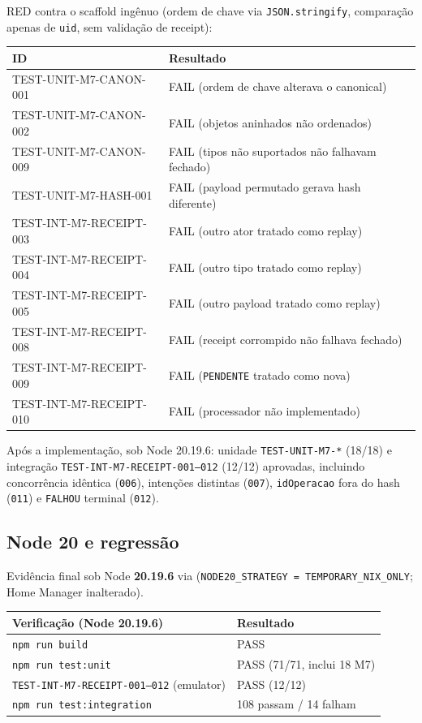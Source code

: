 RED contra o scaffold ingênuo (ordem de chave via \texttt{JSON.stringify},
comparação apenas de \texttt{uid}, sem validação de receipt):

\small
\begin{longtable}{@{}p{}p{}@{}}
\toprule
ID & Resultado \\
\midrule
\endhead
TEST-UNIT-M7-CANON-001 & FAIL (ordem de chave alterava o canonical) \\
TEST-UNIT-M7-CANON-002 & FAIL (objetos aninhados não ordenados) \\
TEST-UNIT-M7-CANON-009 & FAIL (tipos não suportados não falhavam fechado) \\
TEST-UNIT-M7-HASH-001 & FAIL (payload permutado gerava hash diferente) \\
TEST-INT-M7-RECEIPT-003 & FAIL (outro ator tratado como replay) \\
TEST-INT-M7-RECEIPT-004 & FAIL (outro tipo tratado como replay) \\
TEST-INT-M7-RECEIPT-005 & FAIL (outro payload tratado como replay) \\
TEST-INT-M7-RECEIPT-008 & FAIL (receipt corrompido não falhava fechado) \\
TEST-INT-M7-RECEIPT-009 & FAIL (\texttt{PENDENTE} tratado como nova) \\
TEST-INT-M7-RECEIPT-010 & FAIL (processador não implementado) \\
\bottomrule
\end{longtable}
\normalsize

Após a implementação, sob Node 20.19.6: unidade \texttt{TEST-UNIT-M7-*}
(18/18) e integração \texttt{TEST-INT-M7-RECEIPT-001--012} (12/12) aprovadas,
incluindo concorrência idêntica (\texttt{006}), intenções distintas
(\texttt{007}), \texttt{idOperacao} fora do hash (\texttt{011}) e
\texttt{FALHOU} terminal (\texttt{012}).

\subsection{Node 20 e regressão}

Evidência final sob Node \textbf{20.19.6} via
(\texttt{NODE20\_STRATEGY = TEMPORARY\_NIX\_ONLY}; Home Manager inalterado).

\small
\begin{longtable}{@{}p{}p{}@{}}
\toprule
Verificação (Node 20.19.6) & Resultado \\
\midrule
\endhead
\texttt{npm run build} & PASS \\
\texttt{npm run test:unit} & PASS (71/71, inclui 18 M7) \\
\texttt{TEST-INT-M7-RECEIPT-001--012} (emulator) & PASS (12/12) \\
\texttt{npm run test:integration} & 108 passam / 14 falham \\
\bottomrule
\end{longtable}
\normalsize

